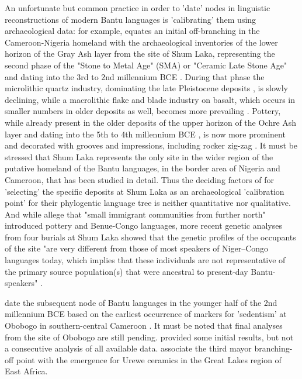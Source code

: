 An unfortunate but common practice in order to 'date' nodes in linguistic reconstructions of modern Bantu languages is 'calibrating' them using archaeological data: for example, \citet[SI p.~2]{Grollemund.2015} equates an initial off-branching in the Cameroon-Nigeria homeland with the archaeological inventories of the lower horizon of the Gray Ash layer from the site of Shum Laka, representing the second phase of the "Stone to Metal Age" (SMA) or "Ceramic Late Stone Age" and dating into the 3rd to 2nd millennium BCE \citep[226--231,243]{Lavachery.2001}. During that phase the microlithic quartz industry, dominating the late Pleistocene deposits \citep[172 Fig.~4]{Cornelissen.2003,Cornelissen.2017}, is slowly declining, while a macrolithic flake and blade industry on basalt, which occurs in smaller numbers in older deposits as well, becomes more prevailing \citep[169 Fig.~1]{Cornelissen.2003,Cornelissen.2017}. Pottery, while already present in the older deposits of the upper horizon of the Ochre Ash layer and dating into the 5th to 4th millennium BCE \citep[224-225 Fig.~4.2--3]{Lavachery.2001}, is now more prominent and decorated with grooves and impressions, including rocker zig-zag \citep[231--232 Fig.~8]{Lavachery.2001}. It must be stressed that Shum Laka represents the only site in the wider region of the putative homeland of the Bantu languages, in the border area of Nigeria and Cameroon, that has been studied in detail. Thus the deciding factors of \citet{Grollemund.2015} for 'selecting' the specific deposits at Shum Laka as an archaeological 'calibration point' for their phylogentic language tree is neither quantitative nor qualitative. And while \citet[SI p.~2]{Grollemund.2015} allege that "small immigrant communities from further north" introduced pottery and Benue-Congo languages, more recent genetic analyses from four burials at Shum Laka showed that the genetic profiles of the occupants of the site "are very different from those of most speakers of Niger–Congo languages today, which implies that these individuals are not representative of the primary source population(s) that were ancestral to present-day Bantu-speakers" \citep[5]{Lipson.2020}. 

\citet[SI p.~2]{Grollemund.2015} date the subsequent node of Bantu languages in the younger half of the 2nd millennium BCE based on the earliest occurrence of markers for 'sedentism' at Obobogo in southern-central Cameroon \citep{deMaret.1982,deMaret.1983,deMaret.1992}. It must be noted that final analyses from the site of Obobogo are still pending. \citet{Claes.1985} provided some initial results, but not a consecutive analysis of all available data. \citet[SI p.~2]{Grollemund.2015} associate the third mayor branching-off point with the emergence for Urewe ceramics in the Great Lakes region of East Africa.

